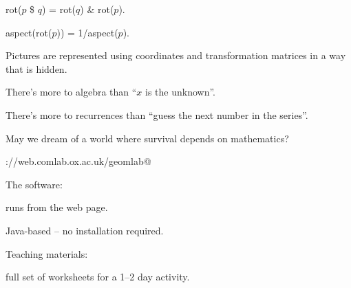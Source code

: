 \item {\vsf rot($p$ \$ $q$) = rot($q$) \& rot($p$)}.
\item {\vsf aspect(rot($p$)) = 1/aspect($p$)}.

Pictures are represented using coordinates and transformation matrices
in a way that is hidden.


\item There's more to algebra than ``$x$ is the unknown''.
\item There's more to recurrences than ``guess the next number in the
series''.
\item May we dream of a world where survival depends on mathematics?


\verb@http://web.comlab.ox.ac.uk/geomlab@

The software:
\item runs from the web page.
\item Java-based -- no installation required.

Teaching materials:
\item full set of worksheets for a 1--2 day activity.

\bye
